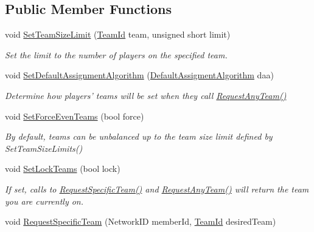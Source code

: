 \subsection*{Public Member Functions}
\begin{DoxyCompactItemize}
\item 
void \hyperlink{class_rak_net_1_1_team_balancer_a17f14e22f2d5c6ebd93c21ea59302b5c}{Set\-Team\-Size\-Limit} (\hyperlink{group___t_e_a_m___b_a_l_a_n_c_e_r___g_r_o_u_p_ga79c7825649955f28135498fb3d9f6894}{Team\-Id} team, unsigned short limit)
\begin{DoxyCompactList}\small\item\em Set the limit to the number of players on the specified team. \end{DoxyCompactList}\item 
void \hyperlink{class_rak_net_1_1_team_balancer_a862120c7ee7e7b3d7ad42789ed523312}{Set\-Default\-Assignment\-Algorithm} (\hyperlink{class_rak_net_1_1_team_balancer_a615ce461958441f9a0a559ba14610172}{Default\-Assigment\-Algorithm} daa)
\begin{DoxyCompactList}\small\item\em Determine how players' teams will be set when they call \hyperlink{class_rak_net_1_1_team_balancer_a1b2f42019a0d7fd31598c9e043f818ed}{Request\-Any\-Team()} \end{DoxyCompactList}\item 
void \hyperlink{class_rak_net_1_1_team_balancer_aadd393c23c6ad1f596b79a8b2572e626}{Set\-Force\-Even\-Teams} (bool force)
\begin{DoxyCompactList}\small\item\em By default, teams can be unbalanced up to the team size limit defined by Set\-Team\-Size\-Limits() \end{DoxyCompactList}\item 
void \hyperlink{class_rak_net_1_1_team_balancer_a156c96e497944274568aeca81e892f51}{Set\-Lock\-Teams} (bool lock)
\begin{DoxyCompactList}\small\item\em If set, calls to \hyperlink{class_rak_net_1_1_team_balancer_a7f8b6ff520c365a18903c7e66b7146a8}{Request\-Specific\-Team()} and \hyperlink{class_rak_net_1_1_team_balancer_a1b2f42019a0d7fd31598c9e043f818ed}{Request\-Any\-Team()} will return the team you are currently on. \end{DoxyCompactList}\item 
void \hyperlink{class_rak_net_1_1_team_balancer_a7f8b6ff520c365a18903c7e66b7146a8}{Request\-Specific\-Team} (Network\-I\-D member\-Id, \hyperlink{group___t_e_a_m___b_a_l_a_n_c_e_r___g_r_o_u_p_ga79c7825649955f28135498fb3d9f6894}{Team\-Id} desired\-Team)

\end{DoxyCompactItemize}
